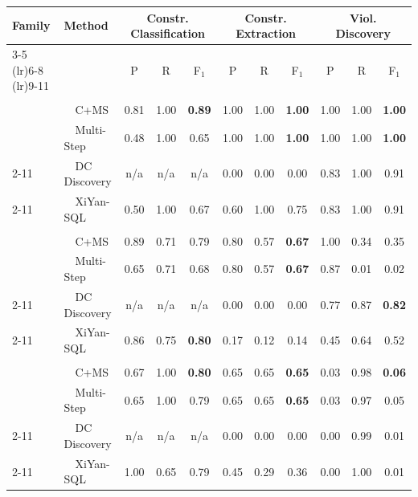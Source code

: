 \begin{tabular}{llccccccccc}
\toprule
\textbf{Family} & \textbf{Method} & \multicolumn{3}{c}{Constr. Classification} & \multicolumn{3}{c}{Constr. Extraction} & \multicolumn{3}{c}{Viol. Discovery} \\
\cmidrule(lr){3-5}  \cmidrule(lr){6-8}  \cmidrule(lr){9-11}
 &  & P & R & F$_1$ & P & R & F$_1$ & P & R & F$_1$ \\
\midrule
\addlinespace[2pt]
\multicolumn{11}{c}{\textbf{Hospital}} \\
\addlinespace[1pt]
\multirow{2}{*}{\system} & ~~C+MS & 0.81 & 1.00 & \textbf{0.89} & 1.00 & 1.00 & \textbf{1.00} & 1.00 & 1.00 & \textbf{1.00} \\
 & ~~Multi-Step & 0.48 & 1.00 & 0.65 & 1.00 & 1.00 & \textbf{1.00} & 1.00 & 1.00 & \textbf{1.00} \\
\cmidrule(l){2-11}
\multirow{1}{*}{Profiling} & ~~DC Discovery & n/a & n/a & n/a & 0.00 & 0.00 & 0.00 & 0.83 & 1.00 & 0.91 \\
\cmidrule(l){2-11}
\multirow{1}{*}{Text2SQL} & ~~XiYan-SQL & 0.50 & 1.00 & 0.67 & 0.60 & 1.00 & 0.75 & 0.83 & 1.00 & 0.91 \\
\midrule
\addlinespace[2pt]
\multicolumn{11}{c}{\textbf{Restaurant}} \\
\addlinespace[1pt]
\multirow{2}{*}{\system} & ~~C+MS & 0.89 & 0.71 & 0.79 & 0.80 & 0.57 & \textbf{0.67} & 1.00 & 0.34 & 0.35 \\
 & ~~Multi-Step & 0.65 & 0.71 & 0.68 & 0.80 & 0.57 & \textbf{0.67} & 0.87 & 0.01 & 0.02 \\
\cmidrule(l){2-11}
\multirow{1}{*}{Profiling} & ~~DC Discovery & n/a & n/a & n/a & 0.00 & 0.00 & 0.00 & 0.77 & 0.87 & \textbf{0.82} \\
\cmidrule(l){2-11}
\multirow{1}{*}{Text2SQL} & ~~XiYan-SQL & 0.86 & 0.75 & \textbf{0.80} & 0.17 & 0.12 & 0.14 & 0.45 & 0.64 & 0.52 \\
\midrule
\addlinespace[2pt]
\multicolumn{11}{c}{\textbf{SISU}} \\
\addlinespace[1pt]
\multirow{2}{*}{\system} & ~~C+MS & 0.67 & 1.00 & \textbf{0.80} & 0.65 & 0.65 & \textbf{0.65} & 0.03 & 0.98 & \textbf{0.06} \\
 & ~~Multi-Step & 0.65 & 1.00 & 0.79 & 0.65 & 0.65 & \textbf{0.65} & 0.03 & 0.97 & 0.05 \\
\cmidrule(l){2-11}
\multirow{1}{*}{Profiling} & ~~DC Discovery & n/a & n/a & n/a & 0.00 & 0.00 & 0.00 & 0.00 & 0.99 & 0.01 \\
\cmidrule(l){2-11}
\multirow{1}{*}{Text2SQL} & ~~XiYan-SQL & 1.00 & 0.65 & 0.79 & 0.45 & 0.29 & 0.36 & 0.00 & 1.00 & 0.01 \\

\end{tabular}
